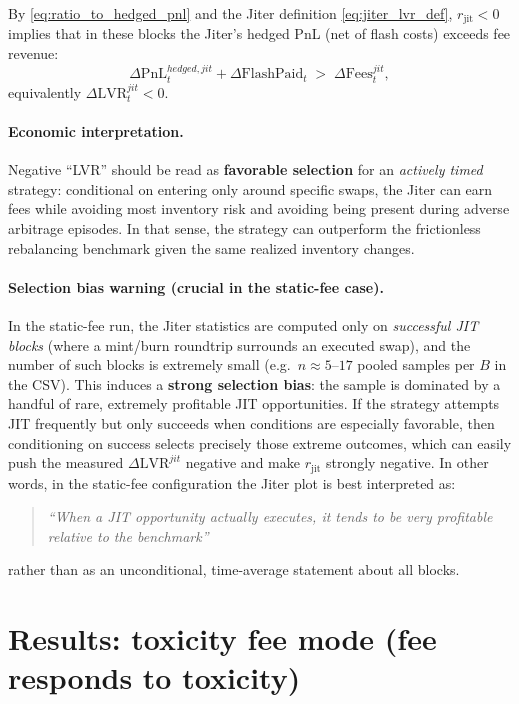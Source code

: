 \documentclass[11pt]{article}
\begin{document}
By \eqref{eq:ratio_to_hedged_pnl} and the Jiter definition \eqref{eq:jiter_lvr_def}, $r_{\mathrm{jit}}<0$ implies that in these
blocks the Jiter's hedged PnL (net of flash costs) exceeds fee revenue:
\[
  \Delta\mathrm{PnL}^{hedged,jit}_t + \Delta\mathrm{FlashPaid}_t
  \;>\;
  \Delta\mathrm{Fees}^{jit}_t,
\]
equivalently $\Delta\mathrm{LVR}^{jit}_t<0$.

\paragraph{Economic interpretation.}
Negative ``LVR'' should be read as \textbf{favorable selection} for an \emph{actively timed} strategy: conditional on entering only
around specific swaps, the Jiter can earn fees while avoiding most inventory risk and avoiding being present during adverse
arbitrage episodes. In that sense, the strategy can outperform the frictionless rebalancing benchmark given the same realized
inventory changes.

\paragraph{Selection bias warning (crucial in the static-fee case).}
In the static-fee run, the Jiter statistics are computed only on \emph{successful JIT blocks} (where a mint/burn roundtrip surrounds
an executed swap), and the number of such blocks is extremely small (e.g.\ $n\approx 5$--$17$ pooled samples per $B$ in the CSV).
This induces a \textbf{strong selection bias}: the sample is dominated by a handful of rare, extremely profitable JIT opportunities.
If the strategy attempts JIT frequently but only succeeds when conditions are especially favorable, then conditioning on success
selects precisely those extreme outcomes, which can easily push the measured $\Delta\mathrm{LVR}^{jit}$ negative and make
$r_{\mathrm{jit}}$ strongly negative.
In other words, in the static-fee configuration the Jiter plot is best interpreted as:
\begin{quote}
  \emph{``When a JIT opportunity actually executes, it tends to be very profitable relative to the benchmark''}
\end{quote}
rather than as an unconditional, time-average statement about all blocks.

\section{Results: toxicity fee mode (fee responds to toxicity)}
\end{document}
